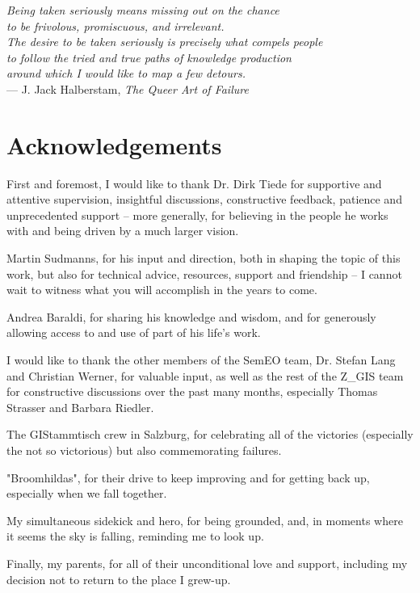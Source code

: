 \cleardoublepage
{}

\begin{flushright}{\slshape
    Being taken seriously means missing out on the chance \\
    to be frivolous, promiscuous, and irrelevant. \\
    The desire to be taken seriously is precisely what compels people \\
    to follow the tried and true paths of knowledge production \\
    around which I would like to map a few detours.} \\ \medskip
    --- J. Jack Halberstam, \emph{The Queer Art of Failure}
\end{flushright}



\bigskip

\begingroup
\let\clearpage\relax
\let\cleardoublepage\relax
\let\cleardoublepage\relax
\chapter*{Acknowledgements}
First and foremost, I would like to thank Dr. Dirk Tiede for supportive and attentive supervision, insightful discussions, constructive feedback, patience and unprecedented support -- more generally, for believing in the people he works with and being driven by a much larger vision.

Martin Sudmanns, for his input and direction, both in shaping the topic of this work, but also for technical advice, resources, support and friendship -- I cannot wait to witness what you will accomplish in the years to come.

Andrea Baraldi, for sharing his knowledge and wisdom, and for generously allowing access to and use of part of his life's work.

I would like to thank the other members of the SemEO team, Dr. Stefan Lang and Christian Werner, for valuable input, as well as the rest of the Z\_GIS team for constructive discussions over the past many months, especially Thomas Strasser and Barbara Riedler.

The GIStammtisch crew in Salzburg, for celebrating all of the victories (especially the not so victorious) but also commemorating failures.

"Broomhildas", for their drive to keep improving and for getting back up, especially when we fall together.

My simultaneous sidekick and hero, for being grounded, and, in moments where it seems the sky is falling, reminding me to look up.

Finally, my parents, for all of their unconditional love and support, including my decision not to return to the place I grew-up.

\endgroup
